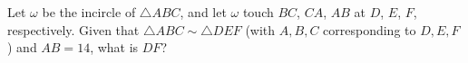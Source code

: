 Let $\omega$ be the incircle of $\triangle ABC$, and let $\omega$ touch $BC$, $CA$, $AB$ at $D$, $E$, $F$, respectively. Given that $\triangle ABC\sim\triangle DEF$ (with $A,B,C$ corresponding to $D,E,F$) and $AB=14$, what is $DF$?

